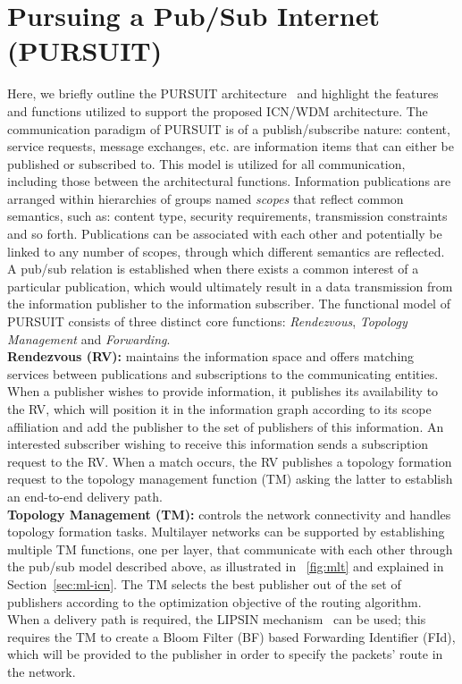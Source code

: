\documentclass[journal]{IEEEtran}
\begin{document}
\section{Pursuing a Pub/Sub Internet (PURSUIT)}\label{sec:pursuit}
Here, we briefly outline the PURSUIT architecture~\cite{tro12:ICnet,tro:ICnet,xyl:ICnet} and highlight the features and functions utilized to support the proposed ICN/WDM architecture. 
The communication paradigm of PURSUIT is of a publish/subscribe
nature: content, service requests, message exchanges, etc. are information items that can either be published or subscribed to. This model is utilized for all communication, including those between the architectural functions. Information publications are arranged within hierarchies of groups named \emph{scopes} that reflect common semantics, such as: content type, security requirements, transmission constraints and so forth. Publications can be associated with each other and potentially be linked to any number of scopes, through which different semantics are reflected. A pub/sub relation is established when there exists a common interest of a particular publication, which would ultimately result in a data transmission from the information publisher to the information subscriber. 
The functional model of PURSUIT consists of three distinct core functions: \emph{Rendezvous}, \emph{Topology Management} and \emph{Forwarding}.\\
\textbf{Rendezvous (RV):}
maintains the information space and offers matching services between publications and subscriptions to the communicating entities. When a publisher wishes to provide information, it publishes its availability to the RV, which will position it in the information graph according to its scope affiliation and add the publisher to the set of publishers of this information. An interested subscriber wishing to receive this information sends a subscription request to the RV. When a match occurs, the RV publishes a topology formation request to the topology management function (TM) asking the latter to establish an end-to-end delivery path.\\
\textbf{Topology Management (TM):}
controls the network connectivity and handles topology formation tasks. Multilayer networks can be supported by establishing multiple TM functions, one per layer, that communicate with each other through the pub/sub model described above, as illustrated in \figurename~\ref{fig:mlt} and explained in Section~\ref{sec:ml-icn}. The TM selects the best publisher out of the set of publishers according to the optimization objective of the routing algorithm. When a delivery path is required, the LIPSIN mechanism~\cite{pet:ICnet} can be used; this requires the TM to create a Bloom Filter (BF) based Forwarding Identifier (FId), which will be provided to the publisher in order to specify the packets' route in the network.\\
\end{document}
